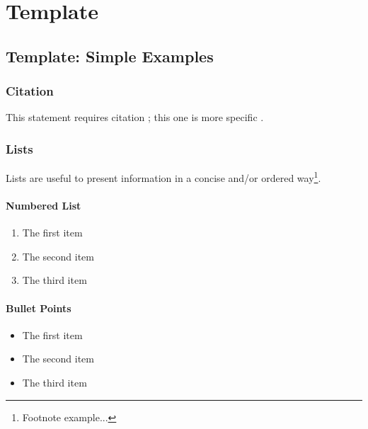 
\part{Template}


\chapter{Template: Simple Examples}


\section{Citation}

This statement requires citation \cite{book_key}; this one is more specific \cite[122]{article_key}.


\section{Lists}

Lists are useful to present information in a concise and/or ordered way\footnote{Footnote example...}.

\subsection{Numbered List}

\begin{enumerate}
  \item The first item
  \item The second item
  \item The third item
\end{enumerate}

\subsection{Bullet Points}

\begin{itemize}
  \item The first item
  \item The second item
  \item The third item
\end{itemize}

